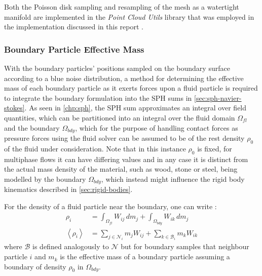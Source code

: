 \documentclass[oneside, a4paper]{book}
\newcounter{phase}[algorithm]
\newcommand\angled[1]{\left\langle#1\right\rangle}
\begin{document}
    Both the Poisson disk sampling and resampling of the mesh as a watertight manifold are implemented in the \textit{Point Cloud Utils} library that was employed in the implementation discussed in this report \autocite{pcu}.

    \subsubsection{Boundary Particle Effective Mass}
    With the boundary particles' positions sampled on the boundary surface according to a blue noise distribution, a method for determining the effective mass of each boundary particle as it exerts forces upon a fluid particle is required to integrate the boundary formulation into the SPH sums in \autoref{sec:sph-navier-stokes}. As seen in \autoref{chp:sph}, the SPH sum approximates an integral over field quantities, which can be partitioned into an integral over the fluid domain $\Omega_{fl}$ and the boundary $\Omega_{bdy}$, which for the purpose of handling contact forces as pressure forces using the fluid solver can be assumed to be of the rest density $\rho_0$ of the fluid under consideration. Note that in this instance $\rho_0$ is fixed, for multiphase flows it can have differing values and in any case it is distinct from the actual mass density of the material, such as wood, stone or steel, being modelled by the boundary $\Omega_{bdy}$, which instead might influence the rigid body kinematics described in \autoref{sec:rigid-bodies}.

    For the density of a fluid particle near the boundary, one can write \autocite{density-maps}:
    \begin{align}
      \rho_i &= \int_{\Omega_{fl}} W_{ij} \,dm_j+  \int_{\Omega_{bdy}} W_{ik} \,dm_j\\
      \angled{\rho_i} &= \sum_{j\in\mathcal{N}_i} m_jW_{ij} + \sum_{k\in\mathcal{B}_i} m_k W_{ik}
    \end{align}
    where $\mathcal{B}$ is defined analogously to $\mathcal{N}$ but for boundary samples that neighbour particle $i$ and $m_k$ is the effective mass of a boundary particle assuming a boundary of density $\rho_0$ in $\Omega_{bdy}$.
\end{document}
